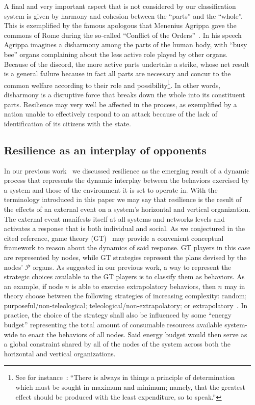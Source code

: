 \documentclass[twocolumn]{svjour3}
\def\P{\hbox{$\mathcal{P}$}}
\begin{document}
A final and very important aspect that is not considered by our classification system is given
by harmony and cohesion between the ``parts'' and the ``whole''. This is exemplified by the famous
apologous that Menenius Agrippa gave the commons of Rome during the so-called ``Conflict of the Orders''~\cite{Lily}.
In his speech Agrippa imagines a disharmony among the parts of the human body, with ``busy bee'' organs
complaining about the less active role played by other organs. Because of the discord,
the more active parts undertake a strike, whose net result is a general failure because in fact
all parts are necessary and
concur to the common welfare according to their role and possibility\footnote{See
	for instance~\cite{leibniz2006shorter}:
	``There
	is always in things a principle of determination which
	must be sought in maximum and minimum; namely, that
	the greatest effect should be produced with the least
	expenditure, so to speak.''}.
In other words, disharmony is a disruptive
force that breaks down the whole into its constituent parts. Resilience may very well be affected
in the process, as exemplified by a nation unable to effectively respond to an attack because of the lack
of identification of its citizens with the state.

\subsection{Resilience as an interplay of opponents}
In our previous work~\cite{DF15b} we discussed resilience as
the emerging result of a dynamic process that represents the dynamic interplay between the behaviors
exercised by a system and those of the environment it is
set to operate in. With the terminology introduced in this paper we may say
that resilience is the result of the effects of an external event on a system's
horizontal and vertical organization. The external event manifests itself at all
systems and networks levels and activates a response that is both individual and
social. As we conjectured in the cited reference, game theory (GT)~\cite{EaKl10} may provide a convenient
conceptual framework to reason about the dynamics of said response.
GT players in this case are represented by nodes, while GT strategies represent the plans
devised by the nodes' \P{} organs. As suggested in our previous work,
a way to represent the strategic choices available to the GT players
is to classify them as behaviors.
As an example, if node $n$ is able to
exercise extrapolatory behaviors, then $n$ may in theory choose between the following strategies
of increasing complexity:
random; purposeful/non-teleological; teleological/non-extrapolatory; or extrapolatory~\cite{RWB43}.
In practice, the choice of the strategy shall also be influenced by some ``energy budget''
representing the total amount of consumable resources available system-wide to enact the behaviors of
all nodes. Said energy budget would then serve as a global constraint
shared by all of the nodes of the system across both the horizontal and vertical organizations.
\end{document}

